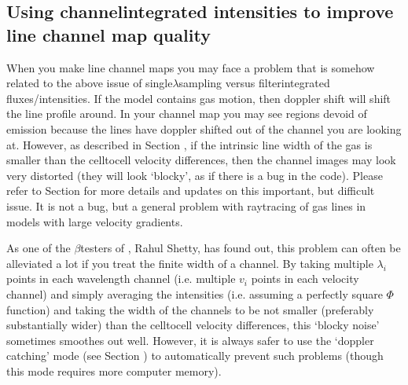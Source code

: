 \documentclass[letterpaper,10pt,english]{sphinxmanual}
\begin{document}
\subsection{Using channel\sphinxhyphen{}integrated intensities to improve line channel map quality}
\label{\detokenize{imagesspectra:using-channel-integrated-intensities-to-improve-line-channel-map-quality}}\label{\detokenize{imagesspectra:sec-wavelength-bands-subsec}}
When you make line channel maps you may face a problem that is somehow
related to the above issue of single\sphinxhyphen{}\(\lambda\)\sphinxhyphen{}sampling versus
filter\sphinxhyphen{}integrated fluxes/intensities. If the model contains gas motion, then
doppler shift will shift the line profile around. In your channel map you
may see regions devoid of emission because the lines have doppler shifted
out of the channel you are looking at. However, as described in Section
{\hyperref[\detokenize{lineradtrans:sec-lines-pitfalls}]{}}, if the intrinsic line width of the gas is smaller
than the cell\sphinxhyphen{}to\sphinxhyphen{}cell velocity differences, then the channel images may look
very distorted (they will look ‘blocky’, as if there is a bug in the
code). Please refer to Section {\hyperref[\detokenize{lineradtrans:sec-lines-pitfalls}]{}} for more details and
updates on this important, but difficult issue. It is not a bug, but a
general problem with ray\sphinxhyphen{}tracing of gas lines in models with large velocity
gradients.

As one of the \(\beta\)\sphinxhyphen{}testers of , Rahul Shetty, has
found out, this problem can often be alleviated a lot if you treat the
finite width of a channel. By taking multiple \(\lambda_i\) points in each
wavelength channel (i.e. multiple \(v_i\) points in each velocity channel) and
simply averaging the intensities (i.e. assuming a perfectly square \(\Phi\)
function) and taking the width of the channels to be not smaller (preferably
substantially wider) than the cell\sphinxhyphen{}to\sphinxhyphen{}cell velocity differences, this
‘blocky noise’ sometimes smoothes out well. However, it is always safer to
use the ‘doppler catching’ mode (see Section {\hyperref[\detokenize{lineradtrans:sec-doppler-catching}]{}})
to automatically prevent such problems (though this mode requires more
computer memory).
\end{document}
